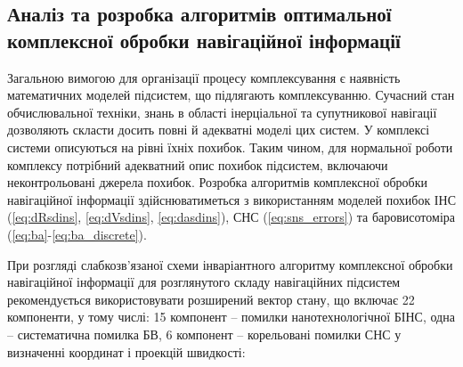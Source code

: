 \subsection{Аналіз та розробка алгоритмів оптимальної комплексної обробки
навігаційної інформації}

Загальною вимогою для організації процесу комплексування є наявність математичних 
моделей підсистем, що підлягають комплексуванню. Сучасний стан обчислювальної техніки, 
знань в області інерціальної та супутникової навігації дозволяють скласти досить 
повні й адекватні моделі цих систем. У комплексі системи описуються на рівні їхніх 
похибок. Таким чином, для нормальної роботи комплексу потрібний адекватний опис похибок 
підсистем, включаючи неконтрольовані джерела похибок. Розробка 
алгоритмів комплексної обробки навігаційної інформації здійснюватиметься з використанням 
моделей похибок ІНС (\eqref{eq:dRsdins}, \eqref{eq:dVsdins}, \eqref{eq:dasdins}), СНС (\eqref{eq:sns_errors}) 
та баровисотоміра (\eqref{eq:ba}-\eqref{eq:ba_discrete}).

При розгляді слабкозв'язаної схеми інваріантного алгоритму комплексної обробки навігаційної  
інформації для розглянутого складу навігаційних підсистем рекомендується використовувати 
розширений вектор стану, що включає 22 компоненти, у тому числі: 15 компонент -- помилки 
нанотехнологічної БІНС, одна -- систематична помилка БВ, 6 компонент -- корельовані 
помилки СНС у визначенні координат і проекцій швидкості:\\

